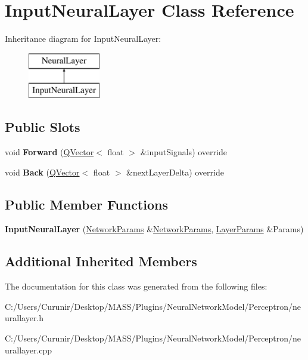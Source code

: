 \hypertarget{class_input_neural_layer}{}\section{Input\+Neural\+Layer Class Reference}
\label{class_input_neural_layer}
Inheritance diagram for Input\+Neural\+Layer\+:\begin{figure}[H]
\begin{center}
\leavevmode
\includegraphics[height=2.000000cm]{class_input_neural_layer}
\end{center}
\end{figure}
\subsection*{Public Slots}
\begin{DoxyCompactItemize}
\item 
\mbox{\label{class_input_neural_layer_a14633f26c2f18e3ca4bd95feb4eb9a91}} 
void {\bfseries Forward} (\hyperlink{class_q_vector}{Q\+Vector}$<$ float $>$ \&input\+Signals) override
\item 
\mbox{\label{class_input_neural_layer_a6a6e5df6ba9100259dda2d7849a8f5b7}} 
void {\bfseries Back} (\hyperlink{class_q_vector}{Q\+Vector}$<$ float $>$ \&next\+Layer\+Delta) override
\end{DoxyCompactItemize}
\subsection*{Public Member Functions}
\begin{DoxyCompactItemize}
\item 
\mbox{\label{class_input_neural_layer_a2e0edec20cf09e830fdeaee505688b1a}} 
{\bfseries Input\+Neural\+Layer} (\hyperlink{struct_perceptron_1_1_network_params}{Network\+Params} \&\hyperlink{struct_perceptron_1_1_network_params}{Network\+Params}, \hyperlink{struct_perceptron_1_1_layer_params}{Layer\+Params} \&Params)
\end{DoxyCompactItemize}
\subsection*{Additional Inherited Members}


The documentation for this class was generated from the following files\+:\begin{DoxyCompactItemize}
\item 
C\+:/\+Users/\+Curunir/\+Desktop/\+M\+A\+S\+S/\+Plugins/\+Neural\+Network\+Model/\+Perceptron/neurallayer.\+h\item 
C\+:/\+Users/\+Curunir/\+Desktop/\+M\+A\+S\+S/\+Plugins/\+Neural\+Network\+Model/\+Perceptron/neurallayer.\+cpp\end{DoxyCompactItemize}
